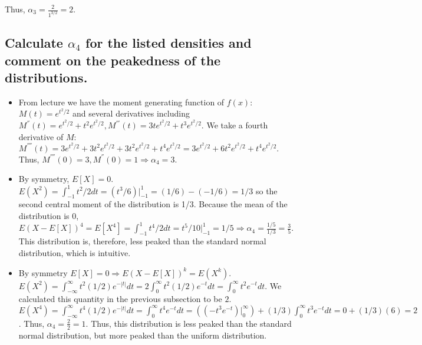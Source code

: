 \documentclass[11pt]{article} %
\begin{document}
Thus, $\alpha_3 = \frac{2}{1^{3/2}} = 2.$

\subsection{Calculate $\alpha_4$ for the listed densities and comment on the peakedness of the distributions.}
\begin{itemize}
\item From lecture we have the moment generating function of $f(x)$: $M(t) = e^{t^2/2}$ and several derivatives including $M^{''}(t) = e^{t^2/2} + t^2 e^{t^2/2}, M^{'''}(t) = 3t e^{t^2/2} + t^3e^{t^2/2}.$ We take a fourth derivative of $M$: $ M^{''''}(t) = 3e^{t^2/2} + 3t^2e^{t^2/2} + 3t^2e^{t^2/2} + t^4 e^{t^2/2} =  3e^{t^2/2} +  6t^2e^{t^2/2} + t^4 e^{t^2/2}.$ Thus, $M^{''''}(0) = 3, M^{''}(0) = 1 \Rightarrow \alpha_4 = 3.$ 
\item By symmetry, $E[X] = 0.$ $E(X^2) = \int_{-1}^{1} t^2/2dt = (t^3/6)|_{-1}^{1} = (1/6) -(-1/6) = 1/3$ so the second central moment of the distribution is 1/3. Because the mean of the distribution is 0, $E(X-E[X])^4 = E[X^4] = \int_{-1}^1 t^4/2 dt = t^5/10|_{-1}^{1} = 1/5 \Rightarrow \alpha_4 = \frac{1/5}{1/3} = \frac{3}{5}.$ This distribution is, therefore, less peaked than the standard normal distribution, which is intuitive.
\item By symmetry $E[X] = 0 \Rightarrow E(X-E[X])^k = E(X^k).$ $E(X^2) = \int_{-\infty}^{\infty}t^2(1/2)e^{-|t|}dt = 2\int_{0}^{\infty}t^2(1/2)e^{-t}dt =  \int_{0}^{\infty}t^2e^{-t}dt.$ We calculated this quantity in the previous subsection to be $2$.  $E(X^4) = \int_{-\infty}^{\infty}t^4(1/2)e^{-|t|}dt = \int_{0}^{\infty}t^4e^{-t}dt = ((-t^3 e^{-t})|_{0}^{\infty}) + (1/3)\int_{0}^{\infty} t^3e^{-t}dt = 0 + (1/3)(6)  =2$. Thus, $\alpha_4 = \frac{2}{2} = 1.$ Thus, this distribution is less peaked than the standard normal distribution, but more peaked than the uniform distribution.
\end{itemize}
\end{document}
